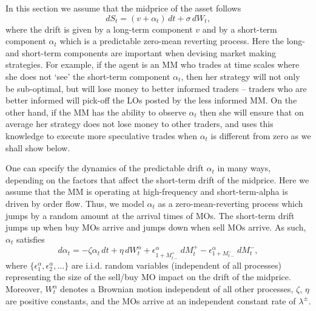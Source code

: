 \documentclass[11pt, a4paper]{book}
\begin{document}
	In this section we assume that the midprice of the asset follows
	\begin{equation}
		dS_t = (v + \alpha_t) \, dt + \sigma \, dW_t, \label{eq:10.30}
	\end{equation}
	where the drift is given by a long-term component $v$ and by a short-term component $\alpha_t$ which is a predictable zero-mean reverting process. Here the long- and short-term components are important when devising market making strategies. For example, if the agent is an MM who trades at time scales where she does not `see' the short-term component $\alpha_t$, then her strategy will not only be sub-optimal, but will lose money to better informed traders – traders who are better informed will pick-off the LOs posted by the less informed MM. On the other hand, if the MM has the ability to observe $\alpha_t$ then she will ensure that on average her strategy does not lose money to other traders, and uses this knowledge to execute more speculative trades when $\alpha_t$ is different from zero as we shall show below.
	
	One can specify the dynamics of the predictable drift $\alpha_t$ in many ways, depending on the factors that affect the short-term drift of the midprice. Here we assume that the MM is operating at high-frequency and short-term-alpha is driven by order flow. Thus, we model $\alpha_t$ as a zero-mean-reverting process which jumps by a random amount at the arrival times of MOs. The short-term drift jumps up when buy MOs arrive and jumps down when sell MOs arrive. As such, $\alpha_t$ satisfies
	\begin{equation}
		d\alpha_t = -\zeta \alpha_t \, dt + \eta \, dW^\alpha_t + \epsilon^\alpha_{1+M^+_{t-}} \, dM^+_t - \epsilon^\alpha_{1+M^-_{t-}} \, dM^-_t, \label{eq:10.31}
	\end{equation}
	where $\{\epsilon^\alpha_1, \epsilon^\alpha_2, \dots\}$ are i.i.d. random variables (independent of all processes) representing the size of the sell/buy MO impact on the drift of the midprice. Moreover, $W^\alpha_t$ denotes a Brownian motion independent of all other processes, $\zeta$, $\eta$ are positive constants, and the MOs arrive at an independent constant rate of $\lambda^\pm$.
	
\end{document}
